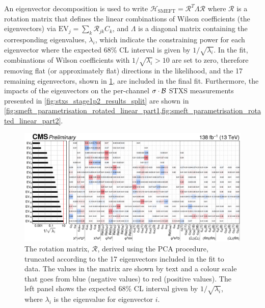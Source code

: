 An eigenvector decomposition is used to write $\mathcal{H}_{\text{SMEFT}} = \mathcal{R}^T \Lambda \mathcal{R}$ where $\mathcal{R}$ is a rotation matrix that defines the linear combinations of Wilson coefficients (the eigenvectors) via $\text{EV}_j = \sum_k \mathcal{R}_{jk} C_k$, and $\Lambda$ is a diagonal matrix containing the corresponding eigenvalues, $\lambda_i$, which indicate the constraining power for each eigenvector where the expected 68\% CL interval is given by $1 / \sqrt{\lambda_i}$. In the fit, combinations of Wilson coefficients with $1/\sqrt{\lambda_i} > 10$ are set to zero, therefore removing flat (or approximately flat) directions in the likelihood, and the 17 remaining eigenvectors, shown in \cref{fig:pca_rotation_matrix}, are included in the final fit. Furthermore, the impacts of the eigenvectors on the per-channel $\sigma \cdot\mathcal{B}$ STXS measurements presented in \cref{fig:stxs_stage1p2_results_split} are shown in \cref{fig:smeft_parametrisation_rotated_linear_part1,fig:smeft_parametrisation_rotated_linear_part2}.

\begin{landscape}
  \begin{figure}
    \centering
    \hspace{-2cm}
    \includegraphics[width=1.1\pagewidth]{Figures/EFT/HIG-21-018-Figure_018.pdf}
    \caption[Truncated PCA Rotation Matrix]{The rotation matrix, $\mathcal{R}$, derived using the PCA procedure, truncated according to the 17 eigenvectors included in the fit to data. The values in the matrix are shown by text and a colour scale that goes from blue (negative values) to red (positive values). The left panel shows the expected 68\% CL interval given by $1/\sqrt{\lambda_i}$, where $\lambda_i$ is the eigenvalue for eigenvector $i$.}\label{fig:pca_rotation_matrix}
  \end{figure}
\end{landscape}

